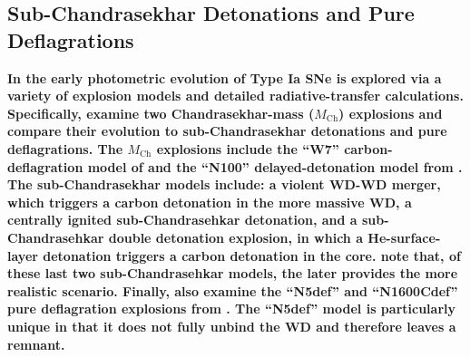 \documentclass[twocolumn]{aastex61}
\begin{document}
\subsection{\textbf{Sub-Chandrasekhar Detonations and Pure Deflagrations}}

\textbf{In \citet{2017MNRAS.472.2787N} the early photometric evolution of Type
Ia SNe is explored via a variety of explosion models and detailed
radiative-transfer calculations. Specifically, \citet{2017MNRAS.472.2787N}
examine two Chandrasekhar-mass ($M_\mathrm{Ch}$) explosions and compare their
evolution to sub-Chandrasekhar detonations and pure deflagrations. The
$M_\mathrm{Ch}$ explosions include the ``W7'' carbon-deflagration model of
\citet{1984ApJ...286..644N} and the ``N100'' delayed-detonation model from
\citet{2013MNRAS.429.1156S}. The sub-Chandrasekhar models include: a violent
WD-WD merger, which triggers a carbon detonation in the more massive WD, a
centrally ignited sub-Chandrasehkar detonation, and a sub-Chandrasehkar double
detonation explosion, in which a He-surface-layer detonation triggers a carbon
detonation in the core. \citet{2017MNRAS.472.2787N} note that, of these last
two sub-Chandrasehkar models, the later provides the more realistic scenario.
Finally, \citeauthor{2017MNRAS.472.2787N} also examine the ``N5def'' and
``N1600Cdef'' pure deflagration explosions from \citet{2014MNRAS.438.1762F}.
The ``N5def'' model is particularly unique in that it does not fully unbind
the WD and therefore leaves a remnant.}
\end{document}
